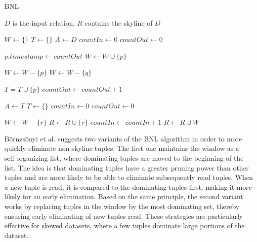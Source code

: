 \documentclass[12pt,a4paper,twoside]{report}
\begin{document}
\begin{algorithm}[H]
	\caption{BNL}
	\label{alg:bnl}
	\begin{algorithmic}
		\Require $D$ is the input relation, 
		\Ensure $R$ contains the skyline of $D$

		\State $W \leftarrow \{\}$
		\State $T \leftarrow \{\}$
		\State $A \leftarrow D$
		\State $countIn \leftarrow 0$
		\State $countOut \leftarrow 0$


			\State $p.timestamp \leftarrow countOut$
			\State $W \leftarrow W \cup \{p\}$

					\State $W \leftarrow W - \{p\}$
					\State \Break
					\State $W \leftarrow W - \{q\}$
				\EndIf
			\EndFor

				\State $T = T \cup \{p\}$
				\State $countOut \leftarrow countOut + 1$
			\EndIf

				\State $A \leftarrow T$
				\State $T \leftarrow \{\}$
				\State $countIn \leftarrow 0$
				\State $countOut \leftarrow 0$
			\EndIf

					\State $W \leftarrow W - \{r\}$
					\State $R \leftarrow R \cup \{r\}$
				\EndIf
			\EndFor
			\State $countIn \leftarrow countIn + 1$
		\EndFor
		\State $R \leftarrow R \cup W$
	\end{algorithmic}
\end{algorithm}

Börnzsönyi et al. suggests two variants of the BNL algorithm in order
to more quickly eliminate non-skyline tuples. The first one maintains
the window as a self-organizing list, where dominating tuples are
moved to the beginning of the list. The idea is that dominating tuples
have a greater pruning power than other tuples and are more likely to
be able to eliminate subsequently read tuples. When a new tuple is
read, it is compared to the dominating tuples first, making it more
likely for an early elimination. Based on the same principle, the
second variant works by replacing tuples in the window by the most
dominating set, thereby ensuring early eliminating of new tuples read.
These strategies are particularly effective for skewed datasets,
where a few tuples dominate large portions of the dataset.
\end{document}
